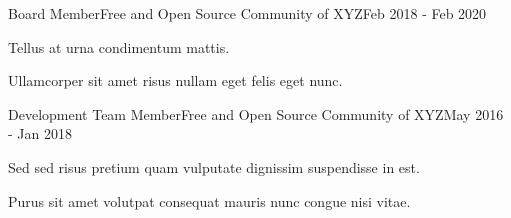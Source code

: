 \documentclass[11pt, a4paper]{awesome-cv}
\begin{document}
        \begin{cventries}

        
                  \cventry
                {Board Member}{Free and Open Source Community of XYZ}{Feb 2018 - Feb 2020}{}
                        {
                          \begin{cvitems}
                            \item{Tellus at urna condimentum mattis.}    \item{Ullamcorper sit amet risus nullam eget felis eget nunc.}
                          \end{cvitems}
                        }
                  \cventry
                {Development Team Member}{Free and Open Source Community of XYZ}{May 2016 - Jan 2018}{}
                        {
                          \begin{cvitems}
                            \item{Sed sed risus pretium quam vulputate dignissim suspendisse in est.}    \item{Purus sit amet volutpat consequat mauris nunc congue nisi vitae.}
                          \end{cvitems}
                        }
        \end{cventries}

        
\end{document}

